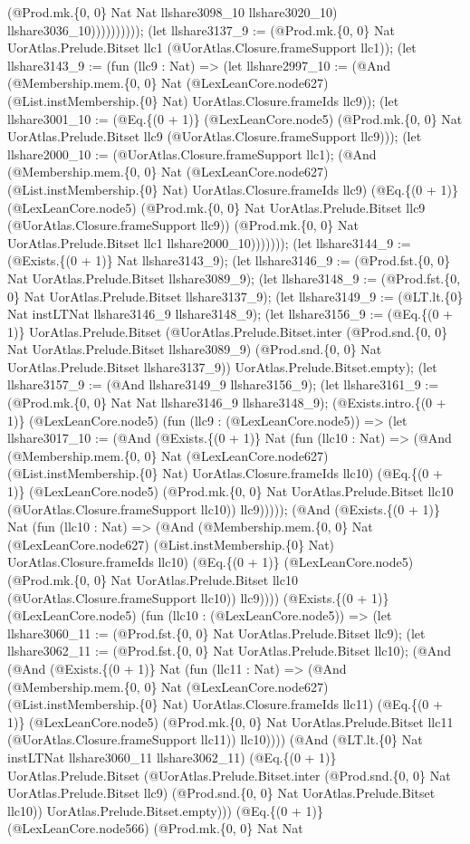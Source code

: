 \documentclass[11pt]{article}
\begin{document}
(@Prod.mk.\{0, 0\} Nat Nat llshare3098\_10 llshare3020\_10) llshare3036\_10)))))))))); (let llshare3137\_9 := (@Prod.mk.\{0, 0\} Nat UorAtlas.Prelude.Bitset llc1 (@UorAtlas.Closure.frameSupport llc1)); (let llshare3143\_9 := (fun (llc9 : Nat) => (let llshare2997\_10 := (@And (@Membership.mem.\{0, 0\} Nat (@LexLeanCore.node627) (@List.instMembership.\{0\} Nat) UorAtlas.Closure.frameIds llc9)); (let llshare3001\_10 := (@Eq.\{(0 + 1)\} (@LexLeanCore.node5) (@Prod.mk.\{0, 0\} Nat UorAtlas.Prelude.Bitset llc9 (@UorAtlas.Closure.frameSupport llc9))); (let llshare2000\_10 := (@UorAtlas.Closure.frameSupport llc1); (@And (@Membership.mem.\{0, 0\} Nat (@LexLeanCore.node627) (@List.instMembership.\{0\} Nat) UorAtlas.Closure.frameIds llc9) (@Eq.\{(0 + 1)\} (@LexLeanCore.node5) (@Prod.mk.\{0, 0\} Nat UorAtlas.Prelude.Bitset llc9 (@UorAtlas.Closure.frameSupport llc9)) (@Prod.mk.\{0, 0\} Nat UorAtlas.Prelude.Bitset llc1 llshare2000\_10))))))); (let llshare3144\_9 := (@Exists.\{(0 + 1)\} Nat llshare3143\_9); (let llshare3146\_9 := (@Prod.fst.\{0, 0\} Nat UorAtlas.Prelude.Bitset llshare3089\_9); (let llshare3148\_9 := (@Prod.fst.\{0, 0\} Nat UorAtlas.Prelude.Bitset llshare3137\_9); (let llshare3149\_9 := (@LT.lt.\{0\} Nat instLTNat llshare3146\_9 llshare3148\_9); (let llshare3156\_9 := (@Eq.\{(0 + 1)\} UorAtlas.Prelude.Bitset (@UorAtlas.Prelude.Bitset.inter (@Prod.snd.\{0, 0\} Nat UorAtlas.Prelude.Bitset llshare3089\_9) (@Prod.snd.\{0, 0\} Nat UorAtlas.Prelude.Bitset llshare3137\_9)) UorAtlas.Prelude.Bitset.empty); (let llshare3157\_9 := (@And llshare3149\_9 llshare3156\_9); (let llshare3161\_9 := (@Prod.mk.\{0, 0\} Nat Nat llshare3146\_9 llshare3148\_9); (@Exists.intro.\{(0 + 1)\} (@LexLeanCore.node5) (fun (llc9 : (@LexLeanCore.node5)) => (let llshare3017\_10 := (@And (@Exists.\{(0 + 1)\} Nat (fun (llc10 : Nat) => (@And (@Membership.mem.\{0, 0\} Nat (@LexLeanCore.node627) (@List.instMembership.\{0\} Nat) UorAtlas.Closure.frameIds llc10) (@Eq.\{(0 + 1)\} (@LexLeanCore.node5) (@Prod.mk.\{0, 0\} Nat UorAtlas.Prelude.Bitset llc10 (@UorAtlas.Closure.frameSupport llc10)) llc9))))); (@And (@Exists.\{(0 + 1)\} Nat (fun (llc10 : Nat) => (@And (@Membership.mem.\{0, 0\} Nat (@LexLeanCore.node627) (@List.instMembership.\{0\} Nat) UorAtlas.Closure.frameIds llc10) (@Eq.\{(0 + 1)\} (@LexLeanCore.node5) (@Prod.mk.\{0, 0\} Nat UorAtlas.Prelude.Bitset llc10 (@UorAtlas.Closure.frameSupport llc10)) llc9)))) (@Exists.\{(0 + 1)\} (@LexLeanCore.node5) (fun (llc10 : (@LexLeanCore.node5)) => (let llshare3060\_11 := (@Prod.fst.\{0, 0\} Nat UorAtlas.Prelude.Bitset llc9); (let llshare3062\_11 := (@Prod.fst.\{0, 0\} Nat UorAtlas.Prelude.Bitset llc10); (@And (@And (@Exists.\{(0 + 1)\} Nat (fun (llc11 : Nat) => (@And (@Membership.mem.\{0, 0\} Nat (@LexLeanCore.node627) (@List.instMembership.\{0\} Nat) UorAtlas.Closure.frameIds llc11) (@Eq.\{(0 + 1)\} (@LexLeanCore.node5) (@Prod.mk.\{0, 0\} Nat UorAtlas.Prelude.Bitset llc11 (@UorAtlas.Closure.frameSupport llc11)) llc10)))) (@And (@LT.lt.\{0\} Nat instLTNat llshare3060\_11 llshare3062\_11) (@Eq.\{(0 + 1)\} UorAtlas.Prelude.Bitset (@UorAtlas.Prelude.Bitset.inter (@Prod.snd.\{0, 0\} Nat UorAtlas.Prelude.Bitset llc9) (@Prod.snd.\{0, 0\} Nat UorAtlas.Prelude.Bitset llc10)) UorAtlas.Prelude.Bitset.empty))) (@Eq.\{(0 + 1)\} (@LexLeanCore.node566) (@Prod.mk.\{0, 0\} Nat Nat 
\end{document}
